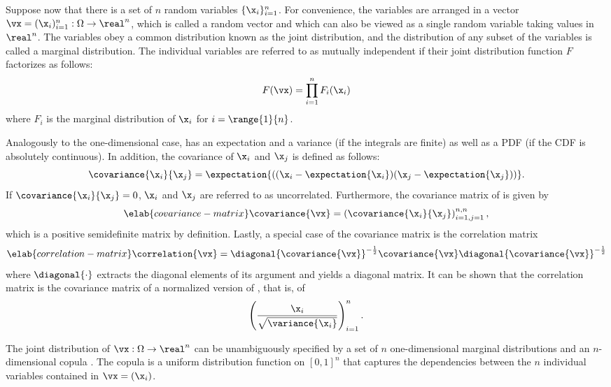 Suppose now that there is a set of $n$ random variables $\{ \x_i \}_{i = 1}^n$.
For convenience, the variables are arranged in a vector $\vx = (\x_i)_{i = 1}^n:
\Omega \to \real^n$, which is called a random vector and which can also be
viewed as a single random variable taking values in $\real^n$. The variables
obey a common distribution known as the joint distribution, and the distribution
of any subset of the variables is called a marginal distribution. The individual
variables are referred to as mutually independent if their joint distribution
function $F$ factorizes as follows:
\[
  F(\vx) = \prod_{i = 1}^n F_i(\x_i)
\]
where $F_i$ is the marginal distribution of $\x_i$ for $i = \range{1}{n}$.

Analogously to the one-dimensional case, \vx has an expectation and a variance
(if the integrals are finite) as well as a \ac{PDF} (if the \ac{CDF} is
absolutely continuous). In addition, the covariance of $\x_i$ and $\x_j$ is
defined as follows:
\[
  \covariance{\x_i}{\x_j} = \expectation{((\x_i - \expectation{\x_i})(\x_j - \expectation{\x_j}))}.
\]
If $\covariance{\x_i}{\x_j} = 0$, $\x_i$ and $\x_j$ are referred to as
uncorrelated. Furthermore, the covariance matrix of \vx is given by
\begin{equation} \elab{covariance-matrix}
  \covariance{\vx} = \left(\covariance{\x_i}{\x_j}\right)_{i = 1, j = 1}^{n, n},
\end{equation}
which is a positive semidefinite matrix by definition. Lastly, a special case of
the covariance matrix is the correlation matrix
\begin{equation} \elab{correlation-matrix}
  \correlation{\vx} = \diagonal{\covariance{\vx}}^{-\frac{1}{2}} \covariance{\vx} \diagonal{\covariance{\vx}}^{-\frac{1}{2}}
\end{equation}
where $\diagonal{\cdot}$ extracts the diagonal elements of its argument and
yields a diagonal matrix. It can be shown that the correlation matrix is the
covariance matrix of a normalized version of \vx, that is, of
\[
  \left(\frac{\x_i}{\sqrt{\variance{\x_i}}}\right)_{i = 1}^n.
\]

The joint distribution of $\vx: \Omega \to \real^n$ can be unambiguously
specified by a set of $n$ one-dimensional marginal distributions and an
$n$-dimensional copula \cite{nelsen2006}. The copula is a uniform distribution
function on $[0, 1]^n$ that captures the dependencies between the $n$ individual
variables contained in $\vx = (\x_i)$.
